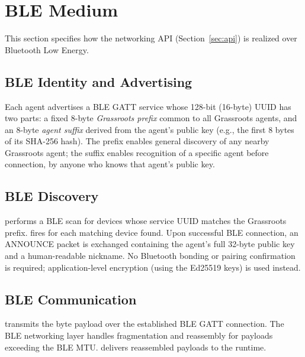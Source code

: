 \section{BLE Medium}
\label{sec:ble}
This section specifies how the networking API (Section~\ref{sec:api}) is realized over Bluetooth Low Energy.
\subsection{BLE Identity and Advertising}
\label{sec:ble-identity}
Each agent advertises a BLE GATT service whose 128-bit (16-byte) UUID has two parts: a fixed 8-byte \emph{Grassroots prefix} common to all Grassroots agents, and an 8-byte \emph{agent suffix} derived from the agent's public key (e.g., the first 8 bytes of its SHA-256 hash). The prefix enables general discovery of any nearby Grassroots agent; the suffix enables recognition of a specific agent before connection, by anyone who knows that agent's public key.
\subsection{BLE Discovery}
\label{sec:ble-discovery}
 performs a BLE scan for devices whose service UUID matches the Grassroots prefix.  fires for each matching device found.
Upon successful BLE connection, an ANNOUNCE packet is exchanged containing the agent's full 32-byte public key and a human-readable nickname. No Bluetooth bonding or pairing confirmation is required; application-level encryption (using the Ed25519 keys) is used instead.
\subsection{BLE Communication}
\label{sec:ble-comm}
 transmits the byte payload over the established BLE GATT connection. The BLE networking layer handles fragmentation and reassembly for payloads exceeding the BLE MTU.  delivers reassembled payloads to the runtime.
